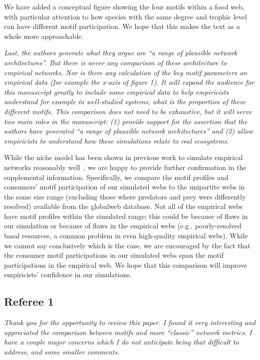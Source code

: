 \documentclass[12pt]{article}
\newcommand{\us}{\rm \setlength{\leftskip}{0.3cm} \setlength{\rightskip}{0.3cm}}
\newcommand{\them}{\it \setlength{\leftskip}{0cm} \setlength{\rightskip}{0cm}}
\begin{document}
    \us
    We have added a conceptual figure showing the four motifs within a food web, with particular attention to how species with the same degree and trophic level can have different motif participation. We hope that this makes the text as a whole more approachable.

    \them
    Last, the authors generate what they argue are ``a range of plausible network architectures''.  But there is never any comparison of these architecture to empirical networks.  Nor is there any calculation of the key motif parameters on empirical data (for example the x-axis of figure 1). It will expand the audience for this manuscript greatly to include some empirical data to help empiricists understand for example in well-studied systems, what is the proportion of these different motifs.  This comparison does not need to be exhaustive, but it will serve two main roles in the manuscript: (1) provide support for the assertion that the authors have generated ``a range of plausible network architectures'' and (2) allow empiricists to understand how these simulations relate to real ecosystems.  
    
    \us
    While the niche model has been shown in previous work to simulate empirical networks reasonably well~\citep{Stouffer2005a,Stouffer2006}, we are happy to provide further confirmation in the supplemental information.
    Specifically, we compare the motif profiles and consumers' motif participation of our simulated webs to the  unipartite webs in the same size range (excluding those where predators and prey were differently resolved) available from the globalweb database.
    Not all of the empirical webs have motif profiles within the simulated range; this could be because of flaws in our simulation or because of flaws in the empirical webs (e.g., poorly-resolved basal resources, a common problem in even high-quality empirical webs). 
    While we cannot say conclusively which is the case, we are encouraged by the fact that the consumer motif participations in our simulated webs span the motif participations in the empirical web.
    We hope that this comparison will improve empiricists' confidence in our simulations.

\clearpage

\subsection*{Referee 1}

    \them
    Thank you for the opportunity to review this paper. I found it very interesting and appreciated the comparison between motifs and more ``classic'' network metrics. I have a couple major concerns which I do not anticipate being that difficult to address, and some smaller comments.
    
\end{document}
